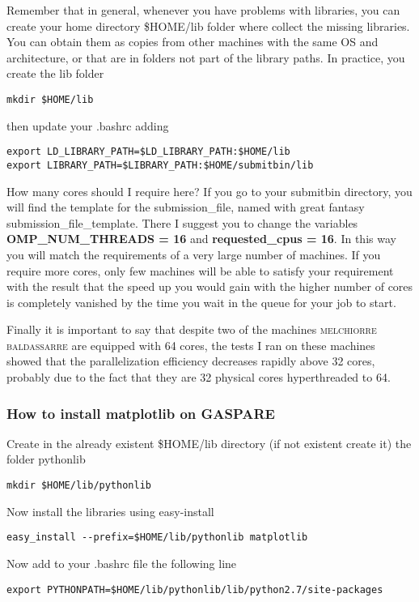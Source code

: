 \documentclass[10pt,a4paper,twoside]{article} %
\begin{document}
Remember that in general, whenever you have problems with libraries, you can create your home directory \$HOME/lib folder where collect the missing libraries. You can obtain them as copies from other machines with the same OS and architecture, or that are in folders not part of the library paths. In practice, you create the lib folder
\begin{verbatim}
mkdir $HOME/lib
\end{verbatim}
then update your .bashrc adding
\begin{verbatim}
export LD_LIBRARY_PATH=$LD_LIBRARY_PATH:$HOME/lib
export LIBRARY_PATH=$LIBRARY_PATH:$HOME/submitbin/lib
\end{verbatim}

How many cores should I require here? 
If you go to your submitbin directory, you will find the template for the submission\_file, named with great fantasy submission\_file\_template. There I suggest you to change the variables \textbf{OMP\_NUM\_THREADS = 16} and \textbf{requested\_cpus = 16}. In this way you will match the requirements of a very large number of machines. If you require more cores, only few machines will be able to satisfy your requirement with the result that the speed up you would gain with the higher number of cores is completely vanished by the time you wait in the queue for your job to start.

Finally it is important to say that despite two of the machines \textsc{melchiorre} \textsc{baldassarre} are equipped with 64 cores, the tests I ran on these machines showed that the parallelization efficiency decreases rapidly above 32 cores, probably due to the fact that they are 32 physical cores hyperthreaded to 64. 

\subsubsection{How to install matplotlib on GASPARE}\label{viscosity}

Create in the already existent \$HOME/lib directory (if not existent create it) the folder pythonlib
\begin{verbatim}
mkdir $HOME/lib/pythonlib
\end{verbatim}
Now install the libraries using easy-install
\begin{verbatim}
easy_install --prefix=$HOME/lib/pythonlib matplotlib
\end{verbatim}
Now add to your .bashrc file the following line
\begin{verbatim}
export PYTHONPATH=$HOME/lib/pythonlib/lib/python2.7/site-packages
\end{verbatim}
\end{document}
